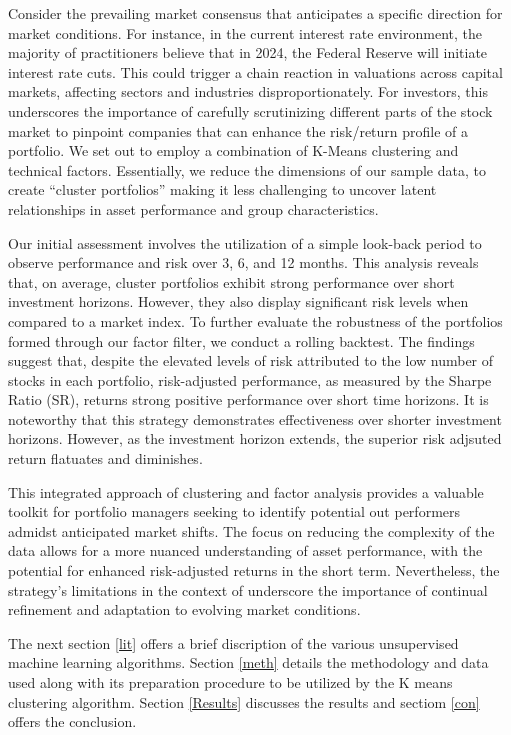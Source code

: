 \documentclass[11pt,preprint, authoryear]{elsarticle}
\numberwithin{equation}{section}
\numberwithin{figure}{section}
\numberwithin{table}{section}
\begin{document}
Consider the prevailing market consensus that anticipates a specific
direction for market conditions. For instance, in the current interest
rate environment, the majority of practitioners believe that in 2024,
the Federal Reserve will initiate interest rate cuts. This could trigger
a chain reaction in valuations across capital markets, affecting sectors
and industries disproportionately. For investors, this underscores the
importance of carefully scrutinizing different parts of the stock market
to pinpoint companies that can enhance the risk/return profile of a
portfolio. We set out to employ a combination of K-Means clustering and
technical factors. Essentially, we reduce the dimensions of our sample
data, to create ``cluster portfolios'' making it less challenging to
uncover latent relationships in asset performance and group
characteristics.

Our initial assessment involves the utilization of a simple look-back
period to observe performance and risk over 3, 6, and 12 months. This
analysis reveals that, on average, cluster portfolios exhibit strong
performance over short investment horizons. However, they also display
significant risk levels when compared to a market index. To further
evaluate the robustness of the portfolios formed through our factor
filter, we conduct a rolling backtest. The findings suggest that,
despite the elevated levels of risk attributed to the low number of
stocks in each portfolio, risk-adjusted performance, as measured by the
Sharpe Ratio (SR), returns strong positive performance over short time
horizons. It is noteworthy that this strategy demonstrates effectiveness
over shorter investment horizons. However, as the investment horizon
extends, the superior risk adjsuted return flatuates and diminishes.

This integrated approach of clustering and factor analysis provides a
valuable toolkit for portfolio managers seeking to identify potential
out performers admidst anticipated market shifts. The focus on reducing
the complexity of the data allows for a more nuanced understanding of
asset performance, with the potential for enhanced risk-adjusted returns
in the short term. Nevertheless, the strategy's limitations in the
context of underscore the importance of continual refinement and
adaptation to evolving market conditions.

The next section \ref{lit} offers a brief discription of the various
unsupervised machine learning algorithms. Section \ref{meth} details the
methodology and data used along with its preparation procedure to be
utilized by the K means clustering algorithm. Section \ref{Results}
discusses the results and sectiom \ref{con} offers the conclusion.
\end{document}
